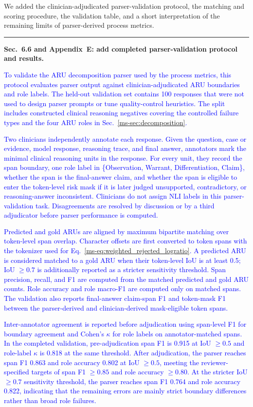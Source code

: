 \documentclass[12pt]{article}
\newcommand{\added}[1]{\textcolor{blue}{#1}}
\newcommand{\responseheading}[1]{%
    \vspace{0.24cm}
    \par\noindent{\large\bfseries #1}\par
    \vspace{0.03cm}
    \noindent\rule{\linewidth}{0.35pt}\par
    \vspace{0.06cm}
    \noindent\ignorespaces
}
\begin{document}
We added the clinician-adjudicated parser-validation protocol, the matching and scoring procedure, the validation table, and a short interpretation of the remaining limits of parser-derived process metrics.


\responseheading{Revision Details}
\textbf{Sec.~6.6 and Appendix~E: add completed parser-validation protocol and results.}
\begin{displayquote}
\added{To validate the ARU decomposition parser used by the process metrics, this protocol evaluates parser output against clinician-adjudicated ARU boundaries and role labels. The held-out validation set contains 100 responses that were not used to design parser prompts or tune quality-control heuristics. The split includes constructed clinical reasoning negatives covering the controlled failure types and the four ARU roles in Sec.~\ref*{ms-sec:decomposition}.}

\added{Two clinicians independently annotate each response. Given the question, case or evidence, model response, reasoning trace, and final answer, annotators mark the minimal clinical reasoning units in the response. For every unit, they record the span boundary, one role label in \{Observation, Warrant, Differentiation, Claim\}, whether the span is the final-answer claim, and whether the span is eligible to enter the token-level risk mask if it is later judged unsupported, contradictory, or reasoning-answer inconsistent. Clinicians do not assign NLI labels in this parser-validation task. Disagreements are resolved by discussion or by a third adjudicator before parser performance is computed.}

\added{Predicted and gold ARUs are aligned by maximum bipartite matching over token-level span overlap. Character offsets are first converted to token spans with the tokenizer used for Eq.~\ref*{ms-eq:weighted_rejected_logratio}. A predicted ARU is considered matched to a gold ARU when their token-level IoU is at least 0.5; IoU $\geq 0.7$ is additionally reported as a stricter sensitivity threshold. Span precision, recall, and F1 are computed from the matched predicted and gold ARU counts. Role accuracy and role macro-F1 are computed only on matched spans. The validation also reports final-answer claim-span F1 and token-mask F1 between the parser-derived and clinician-derived mask-eligible token spans.}

\added{Inter-annotator agreement is reported before adjudication using span-level F1 for boundary agreement and Cohen's $\kappa$ for role labels on annotator-matched spans. In the completed validation, pre-adjudication span F1 is 0.915 at IoU $\geq 0.5$ and role-label $\kappa$ is 0.818 at the same threshold. After adjudication, the parser reaches span F1 0.863 and role accuracy 0.802 at IoU $\geq 0.5$, meeting the reviewer-specified targets of span F1 $\geq 0.85$ and role accuracy $\geq 0.80$. At the stricter IoU $\geq 0.7$ sensitivity threshold, the parser reaches span F1 0.764 and role accuracy 0.822, indicating that the remaining errors are mainly strict boundary differences rather than broad role failures.}


\end{displayquote}
\end{document}
